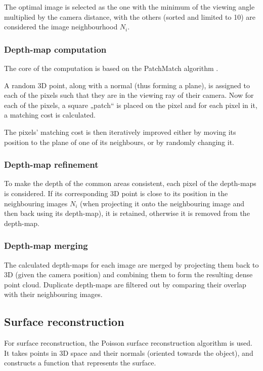 The optimal image is selected as the one with the minimum of the viewing angle multiplied by the camera distance, with the others (sorted and limited to 10) are considered the image neighbourhood $N_i$.

\subsubsection{Depth-map computation}
The core of the computation is based on the PatchMatch algorithm \cite{barnes2009PAR}.

A random 3D point, along with a normal (thus forming a plane), is assigned to each of the pixels such that they are in the viewing ray of their camera.
Now for each of the pixels, a square „patch“ is placed on the pixel and for each pixel in it, a matching cost is calculated.

The pixels' matching cost is then iteratively improved either by moving its position to the plane of one of its neighbours, or by randomly changing it.

\subsubsection{Depth-map refinement}
To make the depth of the common areas consistent, each pixel of the depth-maps is considered.
If its corresponding 3D point is close to its position in the neighbouring images $N_i$ (when projecting it onto the neighbouring image and then back using its depth-map), it is retained, otherwise it is removed from the depth-map.

\subsubsection{Depth-map merging}
The calculated depth-maps for each image are merged by projecting them back to 3D (given the camera position) and combining them to form the resulting dense point cloud.
Duplicate depth-maps are filtered out by comparing their overlap with their neighbouring images.

\subsection{Surface reconstruction}
For surface reconstruction, the Poisson surface reconstruction algorithm \cite{kazhdan2006poisson} is used.
It takes points in 3D space and their normals (oriented towards the object), and constructs a function that represents the surface.

